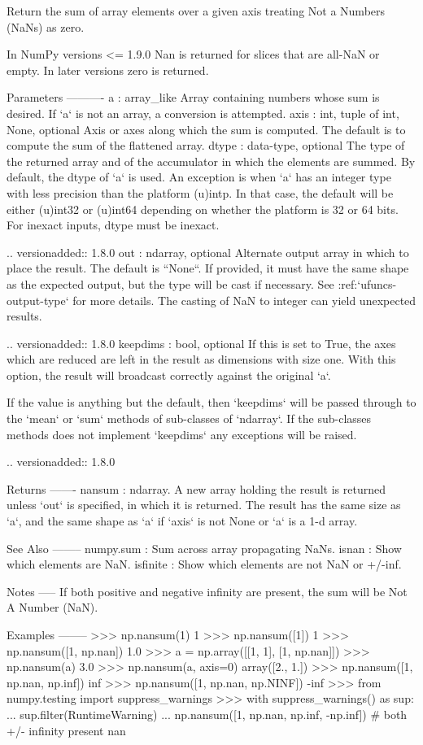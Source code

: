 \begin{DoxyVerb}Return the sum of array elements over a given axis treating Not a
Numbers (NaNs) as zero.

In NumPy versions <= 1.9.0 Nan is returned for slices that are all-NaN or
empty. In later versions zero is returned.

Parameters
----------
a : array_like
    Array containing numbers whose sum is desired. If `a` is not an
    array, a conversion is attempted.
axis : {int, tuple of int, None}, optional
    Axis or axes along which the sum is computed. The default is to compute the
    sum of the flattened array.
dtype : data-type, optional
    The type of the returned array and of the accumulator in which the
    elements are summed.  By default, the dtype of `a` is used.  An
    exception is when `a` has an integer type with less precision than
    the platform (u)intp. In that case, the default will be either
    (u)int32 or (u)int64 depending on whether the platform is 32 or 64
    bits. For inexact inputs, dtype must be inexact.

    .. versionadded:: 1.8.0
out : ndarray, optional
    Alternate output array in which to place the result.  The default
    is ``None``. If provided, it must have the same shape as the
    expected output, but the type will be cast if necessary.  See
    :ref:`ufuncs-output-type` for more details. The casting of NaN to integer
    can yield unexpected results.

    .. versionadded:: 1.8.0
keepdims : bool, optional
    If this is set to True, the axes which are reduced are left
    in the result as dimensions with size one. With this option,
    the result will broadcast correctly against the original `a`.


    If the value is anything but the default, then
    `keepdims` will be passed through to the `mean` or `sum` methods
    of sub-classes of `ndarray`.  If the sub-classes methods
    does not implement `keepdims` any exceptions will be raised.

    .. versionadded:: 1.8.0

Returns
-------
nansum : ndarray.
    A new array holding the result is returned unless `out` is
    specified, in which it is returned. The result has the same
    size as `a`, and the same shape as `a` if `axis` is not None
    or `a` is a 1-d array.

See Also
--------
numpy.sum : Sum across array propagating NaNs.
isnan : Show which elements are NaN.
isfinite : Show which elements are not NaN or +/-inf.

Notes
-----
If both positive and negative infinity are present, the sum will be Not
A Number (NaN).

Examples
--------
>>> np.nansum(1)
1
>>> np.nansum([1])
1
>>> np.nansum([1, np.nan])
1.0
>>> a = np.array([[1, 1], [1, np.nan]])
>>> np.nansum(a)
3.0
>>> np.nansum(a, axis=0)
array([2.,  1.])
>>> np.nansum([1, np.nan, np.inf])
inf
>>> np.nansum([1, np.nan, np.NINF])
-inf
>>> from numpy.testing import suppress_warnings
>>> with suppress_warnings() as sup:
...     sup.filter(RuntimeWarning)
...     np.nansum([1, np.nan, np.inf, -np.inf]) # both +/- infinity present
nan\end{DoxyVerb}

